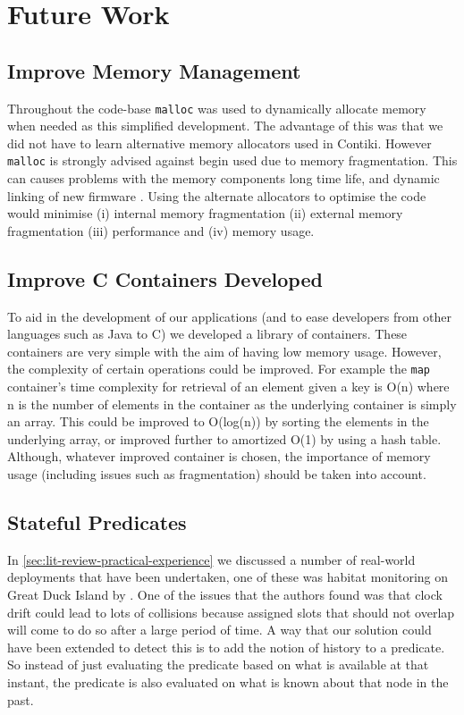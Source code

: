 \section{Future Work}

\subsection{Improve Memory Management}

Throughout the code-base \verb|malloc| was used to dynamically allocate memory when needed as this simplified development. The advantage of this was that we did not have to learn alternative memory allocators used in Contiki. However \verb|malloc| is strongly advised against begin used due to memory fragmentation. This can causes problems with the memory components long time life, and dynamic linking of new firmware \cite{Dai:2004:EEL:1031495.1031516,Dunkels:2006:RDL:1182807.1182810}. Using the alternate allocators to optimise the code would minimise (i) internal memory fragmentation (ii) external memory fragmentation (iii) performance and (iv) memory usage.

\subsection{Improve C Containers Developed}

To aid in the development of our applications (and to ease developers from other languages such as Java to C) we developed a library of containers. These containers are very simple with the aim of having low memory usage. However, the complexity of certain operations could be improved. For example the \verb|map| container's time complexity for retrieval of an element given a key is O(n) where n is the number of elements in the container as the underlying container is simply an array. This could be improved to O(log(n)) by sorting the elements in the underlying array, or improved further to amortized O(1) by using a hash table. Although, whatever improved container is chosen, the importance of memory usage (including issues such as fragmentation) should be taken into account.

\subsection{Stateful Predicates}

In \autoref{sec:lit-review-practical-experience} we discussed a number of real-world deployments that have been undertaken, one of these was habitat monitoring on Great Duck Island by \citeauthor{SzewczykPMC04}. One of the issues that the authors found was that clock drift could lead to lots of collisions because assigned slots that should not overlap will come to do so after a large period of time. A way that our solution could have been extended to detect this is to add the notion of history to a predicate. So instead of just evaluating the predicate based on what is available at that instant, the predicate is also evaluated on what is known about that node in the past.

